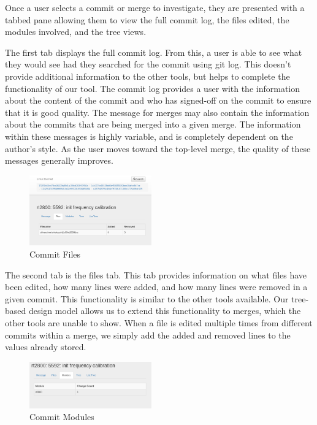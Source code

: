 \documentclass[conference, draftclsnofoot]{IEEEtran}
\begin{document}
Once a user selects a commit or merge to investigate, they are presented with a
tabbed pane allowing them to view the full commit log, the files edited, the modules
involved, and the tree views.

The first tab displays the full commit log. From this, a user is able to see what
they would see had they searched for the commit using git log. This doesn't provide
additional information to the other tools, but helps to complete the functionality
of our tool. The commit log provides a user with the information about the content
of the commit and who has signed-off on the commit to ensure that it is good
quality. The message for merges may also contain the information about the commits
that are being merged into a given merge. The information within these messages is
highly variable, and is completely dependent on the author's style. As the user
moves toward the top-level merge, the quality of these messages generally improves.

\begin{figure}
        \centering
        \includegraphics[width=0.47\textwidth]{figures/file_view.png}
        \caption{Commit Files}
        \label{fig:files}
\end{figure}

The second tab is the files tab. This tab provides information on what files have
been edited, how many lines were added, and how many lines were removed in a given
commit. This functionality is similar to the other tools available. Our tree-based
design model allows us to extend this functionality to merges, which the other tools
are unable to show. When a file is edited multiple times from different commits
within a merge, we simply add the added and removed lines to the values already
stored.

\begin{figure}
        \centering
        \includegraphics[width=0.47\textwidth]{figures/modules.png}
        \caption{Commit Modules}
        \label{fig:modules}
\end{figure}
\end{document}

